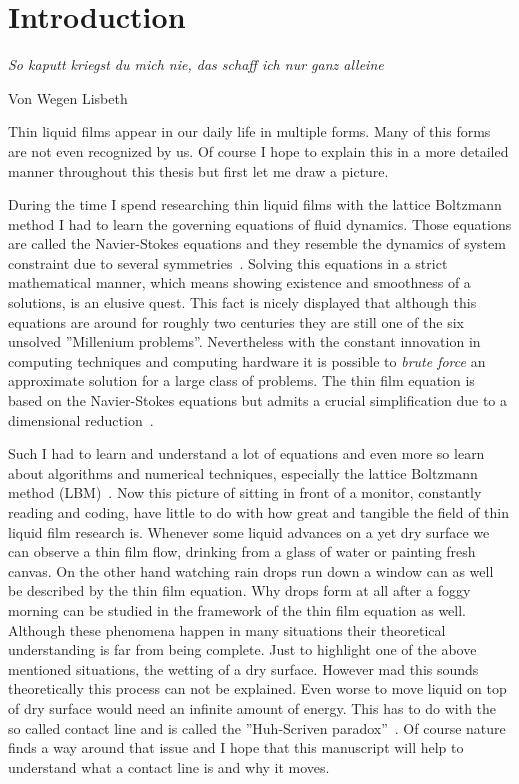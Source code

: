 \chapter{Introduction}
\label{chapter:intro}
\epigraph{\textit{So kaputt kriegst du mich nie, das schaff ich nur ganz alleine}}{Von Wegen Lisbeth}

Thin liquid films appear in our daily life in multiple forms. 
Many of this forms are not even recognized by us.
Of course I hope to explain this in a more detailed manner throughout this thesis but first let me draw a picture.

During the time I spend researching thin liquid films with the lattice Boltzmann method I had to learn the governing equations of fluid dynamics. 
Those equations are called the Navier-Stokes equations and they resemble the dynamics of system constraint due to several symmetries~\cite{Navier, Stokes}.
Solving this equations in a strict mathematical manner, which means showing existence and smoothness of a solutions, is an elusive quest. 
This fact is nicely displayed that although this equations are around for roughly two centuries they are still one of the six unsolved ''Millenium problems''.
Nevertheless with the constant innovation in computing techniques and computing hardware it is possible to \textit{brute force} an approximate solution for a large class of problems.
The thin film equation is based on the Navier-Stokes equations but admits a crucial simplification due to a dimensional reduction~\cite{ReynoldsLubr}.

Such I had to learn and understand a lot of equations and even more so learn about algorithms and numerical techniques, especially the lattice Boltzmann method (LBM)~\cite{doi:10.1146/annurev.fluid.30.1.329, PhysRevE.56.6811, PhysRevE.65.046308}.
Now this picture of sitting in front of a monitor, constantly reading and coding, have little to do with how great and tangible the field of thin liquid film research is.
Whenever some liquid advances on a yet dry surface we can observe a thin film flow, drinking from a glass of water or painting fresh canvas. 
On the other hand watching rain drops run down a window can as well be described by the thin film equation. 
Why drops form at all after a foggy morning can be studied in the framework of the thin film equation as well.
Although these phenomena happen in many situations their theoretical understanding is far from being complete.
Just to highlight one of the above mentioned situations, the wetting of a dry surface.
However mad this sounds theoretically this process can not be explained.
Even worse to move liquid on top of dry surface would need an infinite amount of energy.
This has to do with the so called contact line and is called the ''Huh-Scriven paradox''~\cite{HUH197185}.
Of course nature finds a way around that issue and I hope that this manuscript will help to understand what a contact line is and why it moves.

